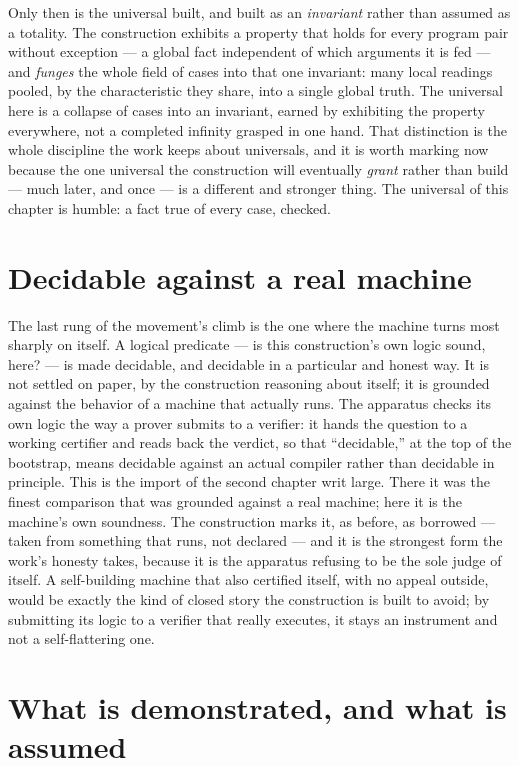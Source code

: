 Only then is the universal built, and built as an \emph{invariant} rather than assumed as a totality. The
construction exhibits a property that holds for every program pair without exception --- a global fact
independent of which arguments it is fed --- and \emph{funges} the whole field of cases into that one
invariant: many local readings pooled, by the characteristic they share, into a single global truth. The
universal here is a collapse of cases into an invariant, earned by exhibiting the property everywhere, not
a completed infinity grasped in one hand. That distinction is the whole discipline the work keeps about
universals, and it is worth marking now because the one universal the construction will eventually
\emph{grant} rather than build --- much later, and once --- is a different and stronger thing. The
universal of this chapter is humble: a fact true of every case, checked.

\section{Decidable against a real machine}
\label{se:decidable-against-real-machine}

The last rung of the movement's climb is the one where the machine turns most sharply on itself. A logical
predicate --- is this construction's own logic sound, here? --- is made decidable, and decidable in a
particular and honest way. It is not settled on paper, by the construction reasoning about itself; it is
grounded against the behavior of a machine that actually runs. The apparatus checks its own logic the way
a prover submits to a verifier: it hands the question to a working certifier and reads back the verdict, so
that ``decidable,'' at the top of the bootstrap, means decidable against an actual compiler rather than
decidable in principle. This is the import of the second chapter writ large. There it was the finest
comparison that was grounded against a real machine; here it is the machine's own soundness. The
construction marks it, as before, as borrowed --- taken from something that runs, not declared --- and it
is the strongest form the work's honesty takes, because it is the apparatus refusing to be the sole judge
of itself. A self-building machine that also certified itself, with no appeal outside, would be exactly the
kind of closed story the construction is built to avoid; by submitting its logic to a verifier that really
executes, it stays an instrument and not a self-flattering one.

\section{What is demonstrated, and what is assumed}
\label{se:demonstrated-assumed-I4}

